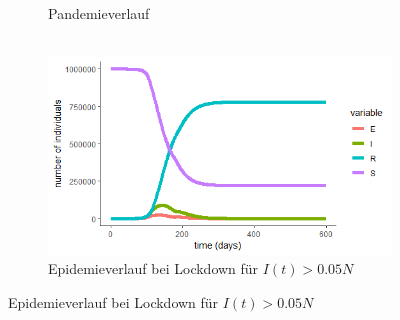 \documentclass{beamer}
\begin{document}
\begin{frame}
\begin{figure}
\begin{subfigure}[b]{0.495\textwidth}
		\caption{Pandemieverlauf \\ \ }
	\end{subfigure}
        \begin{subfigure}[b]{0.455\textwidth}   
            \centering 
            \includegraphics[width=\textwidth]{thres-epi}  
		\caption{Epidemieverlauf bei Lockdown für $I(t) > 0.05N$}           
        \end{subfigure}
 \end{figure}
\end{frame}
\end{document}
